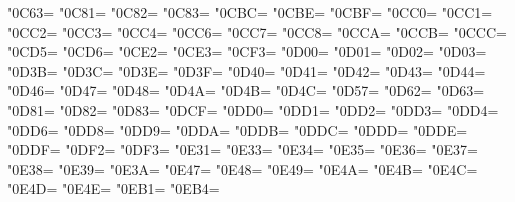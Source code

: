 \XeTeXcharclass"0C63=\KclassCM
\XeTeXcharclass"0C81=\KclassCM
\XeTeXcharclass"0C82=\KclassCM
\XeTeXcharclass"0C83=\KclassCM
\XeTeXcharclass"0CBC=\KclassCM
\XeTeXcharclass"0CBE=\KclassCM
\XeTeXcharclass"0CBF=\KclassCM
\XeTeXcharclass"0CC0=\KclassCM
\XeTeXcharclass"0CC1=\KclassCM
\XeTeXcharclass"0CC2=\KclassCM
\XeTeXcharclass"0CC3=\KclassCM
\XeTeXcharclass"0CC4=\KclassCM
\XeTeXcharclass"0CC6=\KclassCM
\XeTeXcharclass"0CC7=\KclassCM
\XeTeXcharclass"0CC8=\KclassCM
\XeTeXcharclass"0CCA=\KclassCM
\XeTeXcharclass"0CCB=\KclassCM
\XeTeXcharclass"0CCC=\KclassCM
\XeTeXcharclass"0CD5=\KclassCM
\XeTeXcharclass"0CD6=\KclassCM
\XeTeXcharclass"0CE2=\KclassCM
\XeTeXcharclass"0CE3=\KclassCM
\XeTeXcharclass"0CF3=\KclassCM
\XeTeXcharclass"0D00=\KclassCM
\XeTeXcharclass"0D01=\KclassCM
\XeTeXcharclass"0D02=\KclassCM
\XeTeXcharclass"0D03=\KclassCM
\XeTeXcharclass"0D3B=\KclassCM
\XeTeXcharclass"0D3C=\KclassCM
\XeTeXcharclass"0D3E=\KclassCM
\XeTeXcharclass"0D3F=\KclassCM
\XeTeXcharclass"0D40=\KclassCM
\XeTeXcharclass"0D41=\KclassCM
\XeTeXcharclass"0D42=\KclassCM
\XeTeXcharclass"0D43=\KclassCM
\XeTeXcharclass"0D44=\KclassCM
\XeTeXcharclass"0D46=\KclassCM
\XeTeXcharclass"0D47=\KclassCM
\XeTeXcharclass"0D48=\KclassCM
\XeTeXcharclass"0D4A=\KclassCM
\XeTeXcharclass"0D4B=\KclassCM
\XeTeXcharclass"0D4C=\KclassCM
\XeTeXcharclass"0D57=\KclassCM
\XeTeXcharclass"0D62=\KclassCM
\XeTeXcharclass"0D63=\KclassCM
\XeTeXcharclass"0D81=\KclassCM
\XeTeXcharclass"0D82=\KclassCM
\XeTeXcharclass"0D83=\KclassCM
\XeTeXcharclass"0DCF=\KclassCM
\XeTeXcharclass"0DD0=\KclassCM
\XeTeXcharclass"0DD1=\KclassCM
\XeTeXcharclass"0DD2=\KclassCM
\XeTeXcharclass"0DD3=\KclassCM
\XeTeXcharclass"0DD4=\KclassCM
\XeTeXcharclass"0DD6=\KclassCM
\XeTeXcharclass"0DD8=\KclassCM
\XeTeXcharclass"0DD9=\KclassCM
\XeTeXcharclass"0DDA=\KclassCM
\XeTeXcharclass"0DDB=\KclassCM
\XeTeXcharclass"0DDC=\KclassCM
\XeTeXcharclass"0DDD=\KclassCM
\XeTeXcharclass"0DDE=\KclassCM
\XeTeXcharclass"0DDF=\KclassCM
\XeTeXcharclass"0DF2=\KclassCM
\XeTeXcharclass"0DF3=\KclassCM
\XeTeXcharclass"0E31=\KclassCM
\XeTeXcharclass"0E33=\KclassCM
\XeTeXcharclass"0E34=\KclassCM
\XeTeXcharclass"0E35=\KclassCM
\XeTeXcharclass"0E36=\KclassCM
\XeTeXcharclass"0E37=\KclassCM
\XeTeXcharclass"0E38=\KclassCM
\XeTeXcharclass"0E39=\KclassCM
\XeTeXcharclass"0E3A=\KclassCM
\XeTeXcharclass"0E47=\KclassCM
\XeTeXcharclass"0E48=\KclassCM
\XeTeXcharclass"0E49=\KclassCM
\XeTeXcharclass"0E4A=\KclassCM
\XeTeXcharclass"0E4B=\KclassCM
\XeTeXcharclass"0E4C=\KclassCM
\XeTeXcharclass"0E4D=\KclassCM
\XeTeXcharclass"0E4E=\KclassCM
\XeTeXcharclass"0EB1=\KclassCM
\XeTeXcharclass"0EB4=\KclassCM
